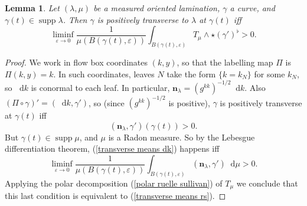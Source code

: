 \documentclass[reqno,10pt]{amsart}
\newcommand*\dif{\mathop{}\!\mathrm{d}}
\DeclareMathOperator{\supp}{supp}
\newcommand{\normal}{\mathbf n}
\newtheorem{lemma}[theorem]{Lemma}
\theoremstyle{definition}
\numberwithin{equation}{section}
\begin{document}
\begin{lemma}
Let $(\lambda, \mu)$ be a measured oriented lamination, $\gamma$ a curve, and $\gamma(t) \in \supp \lambda$.
Then $\gamma$ is positively transverse to $\lambda$ at $\gamma(t)$ iff 
\begin{equation}\label{transverse means rs}
\liminf_{\varepsilon \to 0} \frac{1}{\mu(B(\gamma(t), \varepsilon))} \int_{B(\gamma(t), \varepsilon)} T_\mu \wedge \star (\gamma')^\flat > 0.
\end{equation}
\end{lemma}
\begin{proof}
We work in flow box coordinates $(k, y)$, so that the labelling map $\Pi$ is $\Pi(k, y) = k$.
In such coordinates, leaves $N$ take the form $\{k = k_N\}$ for some $k_N$, so $\dif k$ is conormal to each leaf.
In particular, $\normal_\lambda = (g^{kk})^{-1/2} \dif k$.
Also $(\Pi \circ \gamma)' = (\dif k, \gamma')$, so (since $(g^{kk})^{-1/2}$ is positive), $\gamma$ is positively transverse at $\gamma(t)$ iff
\begin{equation}\label{transverse means dk}
(\normal_\lambda, \gamma')(\gamma(t)) > 0.
\end{equation}
But $\gamma(t) \in \supp \mu$, and $\mu$ is a Radon measure.
So by the Lebesgue differentiation theorem, (\ref{transverse means dk}) happens iff 
$$\liminf_{\varepsilon \to 0} \frac{1}{\mu(B(\gamma(t), \varepsilon))} \int_{B(\gamma(t), \varepsilon)} (\normal_\lambda, \gamma') \dif \mu > 0.$$
Applying the polar decomposition (\ref{polar ruelle sullivan}) of $T_\mu$ we conclude that this last condition is equivalent to (\ref{transverse means rs}).
\end{proof}
\end{document}
